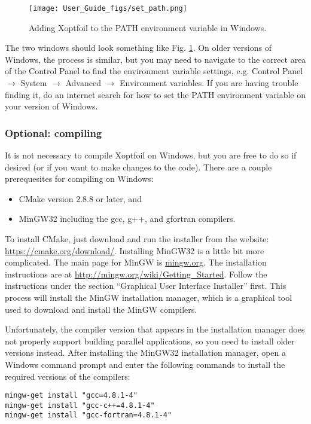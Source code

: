 \documentclass[11pt]{article}
\begin{document}
\begin{figure}
\centering
  \texttt{[image: User\_Guide\_figs/set\_path.png]}
\caption{Adding Xoptfoil to the PATH environment variable in Windows.}
\label{fig:set_path}
\end{figure}

The two windows should look something like Fig. \ref{fig:set_path}.
On older versions of Windows, the process is similar, but you may need to navigate to the
correct area of the Control Panel to find the environment variable settings, e.g. Control
Panel $\rightarrow$ System $\rightarrow$ Advanced $\rightarrow$ Environment variables. If
you are having trouble finding it, do an internet search for how to set the PATH
environment variable on your version of Windows.

\subsubsection{Optional: compiling}

It is not necessary to compile Xoptfoil on Windows, but you are free to do so if desired
(or if you want to make changes to the code). There are a couple prerequesites for
compiling on Windows:

\begin{itemize}
  \item{CMake version 2.8.8 or later, and}
  \item{MinGW32 including the gcc, g++, and gfortran compilers.}
\end{itemize}

To install CMake, just download and run the installer from the website:
\url{https://cmake.org/download/}. Installing MinGW32 is a little bit more complicated.
The main page for
MinGW is \url{mingw.org}. The installation instructions are at
\url{http://mingw.org/wiki/Getting_Started}. Follow the instructions under the section
``Graphical User Interface Installer'' first. This process will install the MinGW
installation manager, which is a graphical tool used to download and install the MinGW
compilers. 

Unfortunately, the compiler version that appears in the installation manager does not
properly support building parallel applications, so you need to install older versions
instead. After installing the MinGW32 installation manager, open a Windows command prompt
and enter the following commands to install the required versions of the compilers:

\begin{verbatim}
mingw-get install "gcc=4.8.1-4"
mingw-get install "gcc-c++=4.8.1-4"
mingw-get install "gcc-fortran=4.8.1-4"
\end{verbatim}
\end{document}
